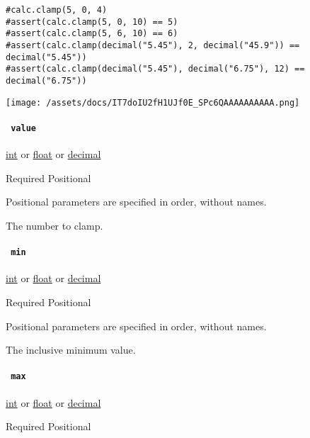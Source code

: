 \begin{verbatim}
#calc.clamp(5, 0, 4)
#assert(calc.clamp(5, 0, 10) == 5)
#assert(calc.clamp(5, 6, 10) == 6)
#assert(calc.clamp(decimal("5.45"), 2, decimal("45.9")) == decimal("5.45"))
#assert(calc.clamp(decimal("5.45"), decimal("6.75"), 12) == decimal("6.75"))
\end{verbatim}

\texttt{[image: /assets/docs/IT7doIU2fH1UJf0E\_SPc6QAAAAAAAAAA.png]}

\paragraph{\texorpdfstring{\texttt{\ value\ }}{ value }}\label{functions-clamp-value}

\href{/docs/reference/foundations/int/}{int} {or}
\href{/docs/reference/foundations/float/}{float} {or}
\href{/docs/reference/foundations/decimal/}{decimal}

{Required} {{ Positional }}

\label{functions-clamp-value-positional-tooltip}
Positional parameters are specified in order, without names.

The number to clamp.

\paragraph{\texorpdfstring{\texttt{\ min\ }}{ min }}\label{functions-clamp-min}

\href{/docs/reference/foundations/int/}{int} {or}
\href{/docs/reference/foundations/float/}{float} {or}
\href{/docs/reference/foundations/decimal/}{decimal}

{Required} {{ Positional }}

\label{functions-clamp-min-positional-tooltip}
Positional parameters are specified in order, without names.

The inclusive minimum value.

\paragraph{\texorpdfstring{\texttt{\ max\ }}{ max }}\label{functions-clamp-max}

\href{/docs/reference/foundations/int/}{int} {or}
\href{/docs/reference/foundations/float/}{float} {or}
\href{/docs/reference/foundations/decimal/}{decimal}

{Required} {{ Positional }}

